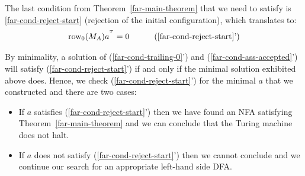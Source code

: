 {  The last condition from Theorem~\ref{far-main-theorem} that we need to satisfy is \eqref{far-cond-reject-start} (rejection of the initial configuration), which translates to:
  \begin{align}
    \row_0 (M_A) a^{\T} & =0
                        & \tag{\ref{far-cond-reject-start}'}
  \end{align}

  By minimality, a solution of (\ref{far-cond-trailing-0}') and (\ref{far-cond-ass-accepted}') will satisfy (\ref{far-cond-reject-start}') if and only if the minimal solution exhibited above does. Hence, we check (\ref{far-cond-reject-start}') for the minimal $a$ that we constructed and there are two cases:

  \begin{itemize}
    \item If $a$ satisfies (\ref{far-cond-reject-start}') then we have found an NFA satisfying Theorem~\ref{far-main-theorem} and we can conclude that the Turing machine does not halt.
    \item If $a$ does not satisfy (\ref{far-cond-reject-start}') then we cannot conclude and we continue our search for an appropriate left-hand side DFA.
  \end{itemize}





}

